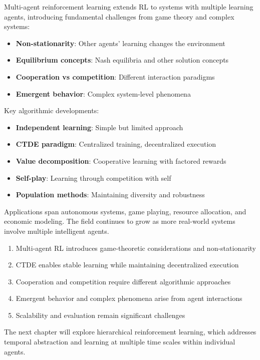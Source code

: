 Multi-agent reinforcement learning extends RL to systems with multiple learning agents, introducing fundamental challenges from game theory and complex systems:

\begin{itemize}
    \item \textbf{Non-stationarity}: Other agents' learning changes the environment
    \item \textbf{Equilibrium concepts}: Nash equilibria and other solution concepts
    \item \textbf{Cooperation vs competition}: Different interaction paradigms
    \item \textbf{Emergent behavior}: Complex system-level phenomena
\end{itemize}

Key algorithmic developments:
\begin{itemize}
    \item \textbf{Independent learning}: Simple but limited approach
    \item \textbf{CTDE paradigm}: Centralized training, decentralized execution
    \item \textbf{Value decomposition}: Cooperative learning with factored rewards
    \item \textbf{Self-play}: Learning through competition with self
    \item \textbf{Population methods}: Maintaining diversity and robustness
\end{itemize}

Applications span autonomous systems, game playing, resource allocation, and economic modeling. The field continues to grow as more real-world systems involve multiple intelligent agents.

\begin{keyideabox}
\begin{enumerate}
    \item Multi-agent RL introduces game-theoretic considerations and non-stationarity
    \item CTDE enables stable learning while maintaining decentralized execution
    \item Cooperation and competition require different algorithmic approaches
    \item Emergent behavior and complex phenomena arise from agent interactions
    \item Scalability and evaluation remain significant challenges
\end{enumerate}
\end{keyideabox}

The next chapter will explore hierarchical reinforcement learning, which addresses temporal abstraction and learning at multiple time scales within individual agents.